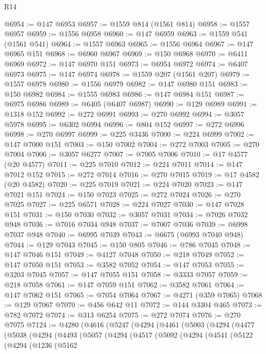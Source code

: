 \begin{lexlean}{R14}
\begin{coremodule}
@6954 := @147 @6953
@6957 := @1559 @814 (@1561 @814)
@6958 := @1557 @6957
@6959 := @1556 @6958
@6960 := @147 @6959
@6963 := @1559 @541 (@1561 @541)
@6964 := @1557 @6963
@6965 := @1556 @6964
@6967 := @147 @6965 @151
@6968 := @6960 @6967
@6969 := @150 @6968
@6970 := @6411 @6969
@6972 := @147 @6970 @151
@6973 := @6954 @6972
@6974 := @6407 @6973
@6975 := @147 @6974
@6978 := @1559 @207 (@1561 @207)
@6979 := @1557 @6978
@6980 := @1556 @6979
@6982 := @147 @6980 @151
@6983 := @150 @6982
@6984 := @1555 @6983
@6986 := @147 @6984 @151
@6987 := @6975 @6986
@6989 := @6405 (@6407 @6987)
@6990 := @129 @6989
@6991 := @1318 @152
@6992 := @272 @6991
@6993 := @270 @6992
@6994 := @3057 @5978
@6995 := @6302 @6994
@6996 := @804 @152
@6997 := @272 @6996
@6998 := @270 @6997
@6999 := @225 @3436
@7000 := @224 @6999
@7002 := @147 @7000 @151
@7003 := @150 @7002
@7004 := @272 @7003
@7005 := @270 @7004
@7006 := @3057 @6277
@7007 := @7005 @7006
@7010 := @17 @4577 (@20 @4577)
@7011 := @225 @7010
@7012 := @224 @7011
@7014 := @147 @7012 @152
@7015 := @272 @7014
@7016 := @270 @7015
@7019 := @17 @4582 (@20 @4582)
@7020 := @225 @7019
@7021 := @224 @7020
@7023 := @147 @7021 @151
@7024 := @150 @7023
@7025 := @272 @7024
@7026 := @270 @7025
@7027 := @225 @6571
@7028 := @224 @7027
@7030 := @147 @7028 @151
@7031 := @150 @7030
@7032 := @3057 @7031
@7034 := @7026 @7032 @948
@7036 := @7016 @7034 @948
@7037 := @7007 @7036
@7039 := @6998 @7037 @948
@7040 := @6995 @7039
@7043 := @6675 (@6993 @7040 @948)
@7044 := @129 @7043
@7045 := @150 @805
@7046 := @786 @7045
@7048 := @147 @7046 @151
@7049 := @4127 @7048
@7050 := @218 @7049
@7052 := @147 @7050 @151
@7053 := @3582 @7052
@7054 := @147 @7053
@7055 := @3203 @7045
@7057 := @147 @7055 @151
@7058 := @3333 @7057
@7059 := @218 @7058
@7061 := @147 @7059 @151
@7062 := @3582 @7061
@7064 := @147 @7062 @151
@7065 := @7054 @7064
@7067 := @4271 (@359 @7065)
@7068 := @129 @7067
@7070 := @456 @642 @11
@7072 := @144 @3304 @465
@7073 := @782 @7072
@7074 := @313 @6254
@7075 := @272 @7074
@7076 := @270 @7075
@7124 := @4280
    (@4616
      (@5247
        (@4294
          (@4461
            (@5003
              (@4294
                (@4477
                  (@5038
                    (@4294
                      (@4493
                        (@5057
                          (@4294
                            (@4517
                              (@5092
                                (@4294
                                  (@4541
                                    (@5122
                                      (@4294
                                        (@1236
                                          (@5162

\end{coremodule}
\end{lexlean}
